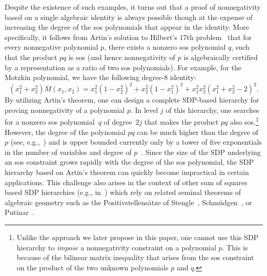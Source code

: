 \documentclass[12pt]{article}
\theoremstyle{remark}
\begin{document}

Despite the existence of such examples, it turns out that a proof of nonnegativity based on a single algebraic identity is always possible though at the expense of increasing the degree of the sos polynomials that appear in the identity. More specifically, it follows from Artin's solution to Hilbert's 17th problem~\cite{Artin1927} that for every nonnegative polynomial $p$, there exists a nonzero sos polynomial $q$, such that the product $pq$ is sos (and hence nonnegativity of $p$ is algebraically certified by a representation as a ratio of two sos polynomials). For example, for the Motzkin polynomial, we have the following degree-8 identity:
\begin{equation}\label{eq:Motzkin.with.multiplier}
(x_1^2+x_2^2)M(x_1,x_2)=x_1^2(1-x_2^2)^2+x_2^2(1-x_1^2)^2+x_1^2x_2^2(x_1^2+x_2^2-2)^2.    
\end{equation}
By utilizing Artin's theorem, one can design a complete SDP-based hierarchy for proving nonnegativity of a polynomial $p$. In level $j$ of this hierarchy, one searches for a nonzero sos polynomial~$q$ of degree~$2j$ that makes the product $pq$ also sos.\footnote{Unlike the approach we later propose in this paper, one cannot use this SDP hierarchy to \emph{impose} a nonnegativity constraint on a polynomial $p$. This is because of the bilinear matrix inequality that arises from the sos constraint on the product of the two unknown polynomials $p$ and $q$.}
However, the degree of the polynomial $pq$ can be much higher than the degree of~$p$ (see, e.g.,~\cite{sos_on_hypercube}) and is upper bounded currently only by a tower of five exponentials in the number of variables and degree of $p$~\cite{lombardi2020elementary}. Since the size of the SDP underlying an sos %
constraint grows rapidly with the degree of the 
sos polynomial, %
the SDP hierarchy based on Artin's theorem can quickly become impractical in certain applications. This challenge also arises in the context of other sum of squares based SDP hierarchies (e.g., in~\cite{Parrilo2000,lasserre2001global,parrilo2003semidefinite}) which rely on related seminal theorems of algebraic geometry such as the
Positivstellens\"atze of Stengle~\cite{stengle1974nullstellensatz}, Schm\"udgen~\cite{Schmudgen1991}, or Putinar~\cite{putinar1993positive}.
\end{document}

